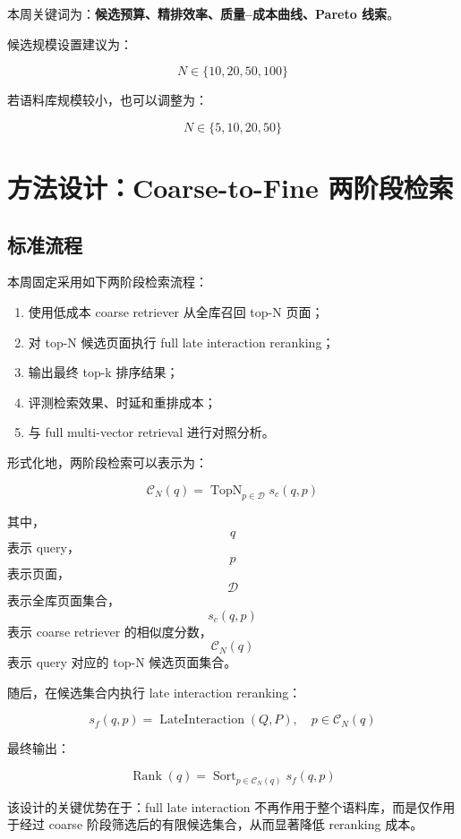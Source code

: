 \documentclass[UTF8,a4paper,12pt]{ctexart}
\begin{document}
	本周关键词为：\textbf{候选预算、精排效率、质量--成本曲线、Pareto 线索}。
	
	候选规模设置建议为：
	
	$$
	N \in \{10, 20, 50, 100\}
	$$
	
	若语料库规模较小，也可以调整为：
	
	$$
	N \in \{5, 10, 20, 50\}
	$$
	
	\section{方法设计：Coarse-to-Fine 两阶段检索}
	
	\subsection{标准流程}
	
	本周固定采用如下两阶段检索流程：
	
	\begin{enumerate}[leftmargin=2em]
		\item 使用低成本 coarse retriever 从全库召回 top-N 页面；
		\item 对 top-N 候选页面执行 full late interaction reranking；
		\item 输出最终 top-k 排序结果；
		\item 评测检索效果、时延和重排成本；
		\item 与 full multi-vector retrieval 进行对照分析。
	\end{enumerate}
	
	形式化地，两阶段检索可以表示为：
	
	$$
	\mathcal{C}_N(q) = \operatorname{TopN}_{p \in \mathcal{D}} s_c(q,p)
	$$
	
	其中，$$q$$ 表示 query，$$p$$ 表示页面，$$\mathcal{D}$$ 表示全库页面集合，$$s_c(q,p)$$ 表示 coarse retriever 的相似度分数，$$\mathcal{C}_N(q)$$ 表示 query 对应的 top-N 候选页面集合。
	
	随后，在候选集合内执行 late interaction reranking：
	
	$$
	s_f(q,p) = \operatorname{LateInteraction}(Q, P), \quad p \in \mathcal{C}_N(q)
	$$
	
	最终输出：
	
	$$
	\operatorname{Rank}(q) = \operatorname{Sort}_{p \in \mathcal{C}_N(q)} s_f(q,p)
	$$
	
	该设计的关键优势在于：full late interaction 不再作用于整个语料库，而是仅作用于经过 coarse 阶段筛选后的有限候选集合，从而显著降低 reranking 成本。
	
\end{document}
